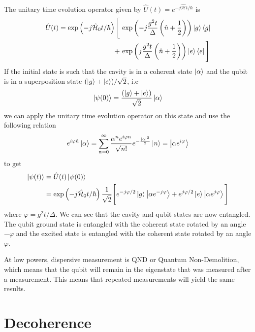 \begin{itemize}
The unitary time evolution operator given by $\hat{U}(t)=e^{-j\hat{\mathcal{H}}t/\hbar}$ is
\begin{align}
\begin{split}
\hat{U}(t) = \text{exp}\left(-j\hat{\mathcal{H}}_0t/\hbar\right)\Bigg[&\text{ exp}\left(-j\frac{g^2t}{\Delta}\left(\hat{n}+\frac{1}{2}\right)\right)\ket{g}\bra{g}\\
+&\text{ exp}\left(j\frac{g^2t}{\Delta}\left(\hat{n}+\frac{1}{2}\right)\right)\ket{e}\bra{e}\Bigg]
\end{split}
\end{align}
If the initial state is such that the cavity is in a coherent state $\ket{\alpha}$ and the qubit is in a superposition state $(\ket{g}+\ket{e})/\sqrt{2}$, i.e
\begin{equation}
\ket{\psi(0)} = \frac{(\ket{g}+\ket{e})}{\sqrt{2}}\ket{\alpha}
\end{equation}
we can apply the unitary time evolution operator on this state and use the following relation
\begin{equation}
e^{i\varphi\hat{n}}\ket{\alpha} = \sum_{n=0}^\infty \frac{\alpha^ne^{i\varphi n}}{\sqrt{n!}}e^{-\frac{|\alpha|^2}{2}}\ket{n} = \ket{\alpha e^{i\varphi}}
\end{equation}
to get
\begin{align}
\begin{split}
\ket{\psi(t)} &= \hat{U}(t)\ket{\psi(0)}\\
&= \text{exp}\left(-j\hat{\mathcal{H}}_0t/\hbar\right)\frac{1}{\sqrt{2}}\Bigg[e^{-j\varphi/2}\ket{g}\ket{\alpha e^{-j\varphi}}+e^{j\varphi/2}\ket{e}\ket{\alpha e^{j\varphi}}\Bigg]
\end{split}
\end{align}
where $\varphi = g^2t/\Delta$. We can see that the cavity and qubit states are now entangled. The qubit ground state is entangled with the coherent state rotated by an angle $-\varphi$ and the excited state is entangled with the coherent state rotated by an angle $\varphi$.

At low powers, dispersive measurement is QND or Quantum Non-Demolition, which means that the qubit will remain in the eigenstate that was measured after a measurement. This means that repeated measurements will yield the same results.
\end{itemize}

\section{Decoherence}


